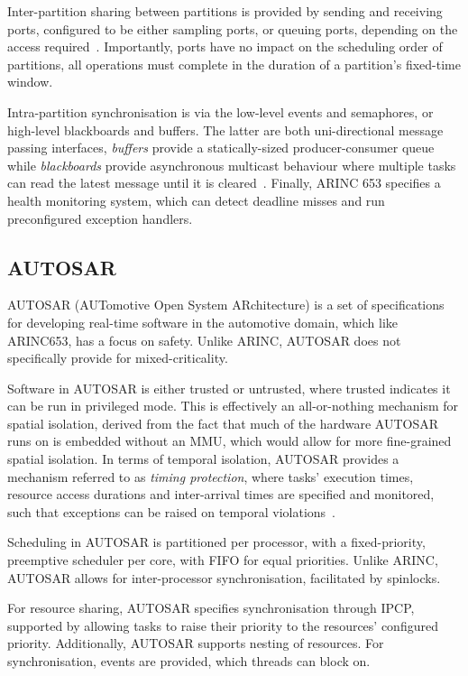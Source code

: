 Inter-partition sharing between partitions is provided by sending and receiving ports, configured to be either
sampling ports, or queuing ports, depending on the access required~\citep{Kinnan_Wlad_04}.
Importantly, ports have no 
impact on the scheduling order of partitions, all operations must complete in the duration of a
partition's fixed-time window.

Intra-partition synchronisation is via the low-level events and semaphores, or high-level
blackboards and buffers. The latter are both uni-directional 
message passing interfaces, \emph{buffers} provide a statically-sized producer-consumer queue while
\emph{blackboards} provide asynchronous multicast behaviour where multiple tasks can read the latest
message until it is cleared~\citep{Zuepke_BL_15}.
Finally, ARINC 653 specifies a health monitoring system, which can detect deadline misses and run
preconfigured exception handlers.

\subsection{AUTOSAR}
\label{sec:os-autosar}

AUTOSAR (AUTomotive Open System ARchitecture) is a set of specifications for developing real-time
software in the automotive domain, which like ARINC653, has a focus on safety. Unlike ARINC, AUTOSAR
does not specifically provide for mixed-criticality.

Software in AUTOSAR is either trusted or untrusted, where trusted indicates it can be run in
privileged mode. This is effectively an all-or-nothing mechanism for spatial isolation, derived
from the fact that much of the hardware AUTOSAR runs on is embedded without an \gls{MMU}, which
would allow for more fine-grained spatial isolation.
In terms of temporal isolation, AUTOSAR provides a mechanism referred to as \emph{timing
protection}, where tasks' execution times, resource access durations and inter-arrival times are
specified and monitored, such that exceptions can be raised on temporal
violations~\citep{Zuepke_BL_15}. 

Scheduling in AUTOSAR is partitioned per processor, with a  
fixed-priority, preemptive scheduler per core, with \gls{FIFO} for equal priorities. Unlike ARINC,
AUTOSAR allows for inter-processor synchronisation, facilitated by spinlocks. 

For resource sharing, AUTOSAR specifies synchronisation through \gls{IPCP}, supported by allowing
tasks to raise their priority to the resources' configured priority. Additionally, AUTOSAR supports
nesting of resources. For synchronisation, events are provided, which threads can block on.

